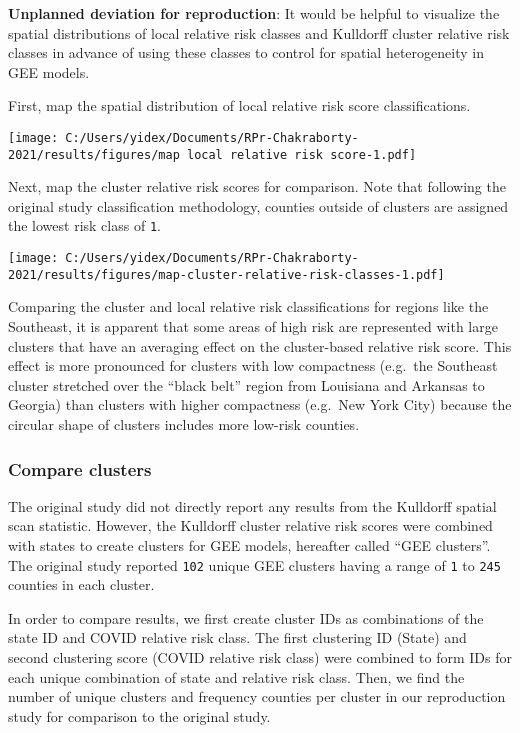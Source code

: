 \documentclass[
]{article}
\begin{document}
\textbf{Unplanned deviation for reproduction}: It would be helpful to
visualize the spatial distributions of local relative risk classes and
Kulldorff cluster relative risk classes in advance of using these
classes to control for spatial heterogeneity in GEE models.

First, map the spatial distribution of local relative risk score
classifications.

\texttt{[image: C:/Users/yidex/Documents/RPr-Chakraborty-2021/results/figures/map local relative risk score-1.pdf]}

Next, map the cluster relative risk scores for comparison. Note that
following the original study classification methodology, counties
outside of clusters are assigned the lowest risk class of \texttt{1}.

\texttt{[image: C:/Users/yidex/Documents/RPr-Chakraborty-2021/results/figures/map-cluster-relative-risk-classes-1.pdf]}

Comparing the cluster and local relative risk classifications for
regions like the Southeast, it is apparent that some areas of high risk
are represented with large clusters that have an averaging effect on the
cluster-based relative risk score. This effect is more pronounced for
clusters with low compactness (e.g.~the Southeast cluster stretched over
the ``black belt'' region from Louisiana and Arkansas to Georgia) than
clusters with higher compactness (e.g.~New York City) because the
circular shape of clusters includes more low-risk counties.

\hypertarget{compare-clusters}{%
\subsubsection{Compare clusters}\label{compare-clusters}}

The original study did not directly report any results from the
Kulldorff spatial scan statistic. However, the Kulldorff cluster
relative risk scores were combined with states to create clusters for
GEE models, hereafter called ``GEE clusters''. The original study
reported \texttt{102} unique GEE clusters having a range of \texttt{1}
to \texttt{245} counties in each cluster.

In order to compare results, we first create cluster IDs as combinations
of the state ID and COVID relative risk class. The first clustering ID
(State) and second clustering score (COVID relative risk class) were
combined to form IDs for each unique combination of state and relative
risk class. Then, we find the number of unique clusters and frequency
counties per cluster in our reproduction study for comparison to the
original study.
\end{document}
